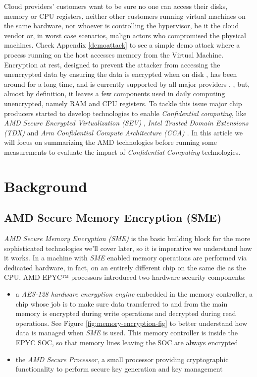 \documentclass[twocolumn]{article}
\begin{document}
Cloud providers' customers want to be sure no one can access their disks, memory or CPU registers, neither other customers running virtual machines on the same hardware, nor whoever is controlling the hypervisor, be it  the cloud vendor or, in worst case scenarios, malign actors who compromised the physical machines. Check Appendix \ref{demoattack} to see a simple demo attack where a process running on the host accesses memory from the Virtual Machine. Encryption at rest, designed to prevent the attacker from accessing the unencrypted data by ensuring the data is encrypted when on disk \cite{azure-enc}, has been around for a long time, and is currently supported by all major providers \cite{aws-enc}, \cite{gcp-enc}, \cite{azure-enc} but, almost by definition, it  leaves a few components used in daily computing unencrypted, namely RAM and CPU registers. To tackle this issue major chip producers started to develop technologies to enable \textit{Confidential computing}, like \textit{AMD Secure Encrypted Virtualization (SEV)} \cite{memory-encryption}, \textit{Intel Trusted Domain Extensions (TDX)} \cite{tdx} and \textit{Arm Confidential Compute Architecture (CCA) \cite{cca}}. In this article we will focus on summarizing the AMD technologies before running some measurements to evaluate the impact of \textit{Confidential Computing} technologies.

\section{Background}
\subsection{AMD Secure Memory Encryption (SME)}

\textit{AMD Secure Memory Encryption (SME)} is the basic building block for the more sophisticated technologies we'll cover later, so it is imperative we understand how it works. In a machine with \textit{SME} enabled memory operations are performed via dedicated hardware, in fact, on an entirely different chip on the same die as the CPU. AMD EPYC™ processors introduced two hardware security components:

\begin{itemize}
    \item a \textit{AES-128 hardware encryption engine} embedded in the memory controller, a chip whose job is to make sure data transferred to and from the main memory is encrypted during write operations and decrypted during read operations. See Figure \ref{fig:memory-encryption-fig} to better understand how data is managed when \textit{SME} is used. This memory controller is inside the EPYC SOC, so that memory lines leaving the SOC are always encrypted
    \item the \textit{AMD Secure Processor}, a small processor providing cryptographic functionality to perform secure key generation and key management
\end{itemize}
\end{document}
